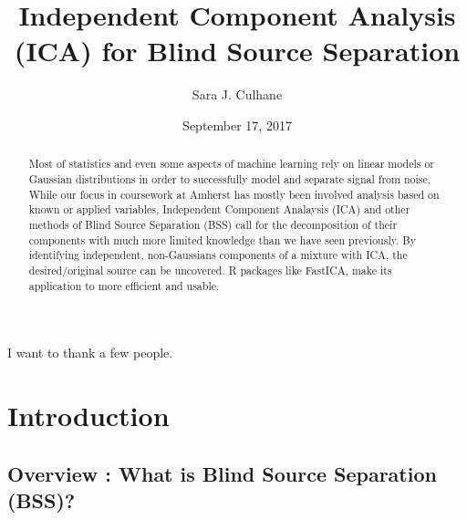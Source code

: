 \documentclass[12pt,twoside]{amherstthesis}
\title{Independent Component Analysis (ICA) for Blind Source Separation}
\author{Sara J. Culhane}
\date{September 17, 2017}
\begin{document}
      \maketitle
  
  \frontmatter %
  \pagestyle{empty} %

      \begin{acknowledgements}
      I want to thank a few people.
    \end{acknowledgements}
  
  

      \hypersetup{linkcolor=black}
    \setcounter{tocdepth}{2}
    \tableofcontents
  
      \listoftables
  
      \listoffigures
  
      \begin{abstract}
      Most of statistics and even some aspects of machine learning rely on
      linear models or Gaussian distributions in order to successfully model
      and separate signal from noise. While our focus in coursework at Amherst
      has mostly been involved analysis based on known or applied variables,
      Independent Component Analaysis (ICA) and other methods of Blind Source
      Separation (BSS) call for the decomposition of their components with
      much more limited knowledge than we have seen previously. By identifying
      independent, non-Gaussians components of a mixture with ICA, the
      desired/original source can be uncovered. R packages like FastICA, make
      its application to more efficient and usable.
    \end{abstract}
  
  
  \mainmatter %
  \pagestyle{fancyplain} %

  \chapter*{Introduction}\label{introduction}
  
  \section{Overview : What is Blind Source Separation
  (BSS)?}\label{overview-what-is-blind-source-separation-bss}
  
\end{document}
